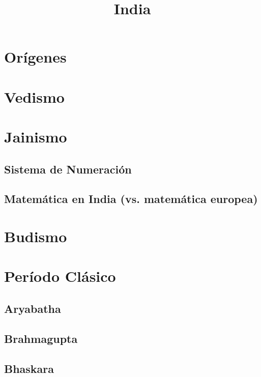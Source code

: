 \documentclass[a4paper,12pt,openany]{article}
\begin{document}
\title{\vspace{-2cm}India}
\date{}
\maketitle

\section{Orígenes}


\section{Vedismo}


\section{Jainismo}


\subsection{Sistema de Numeración}


\subsection{Matemática en India (vs. matemática europea)}


\section{Budismo}


\section{Período Clásico}


\subsection{Aryabatha}


\subsection{Brahmagupta}


\subsection{Bhaskara}

\end{document}
